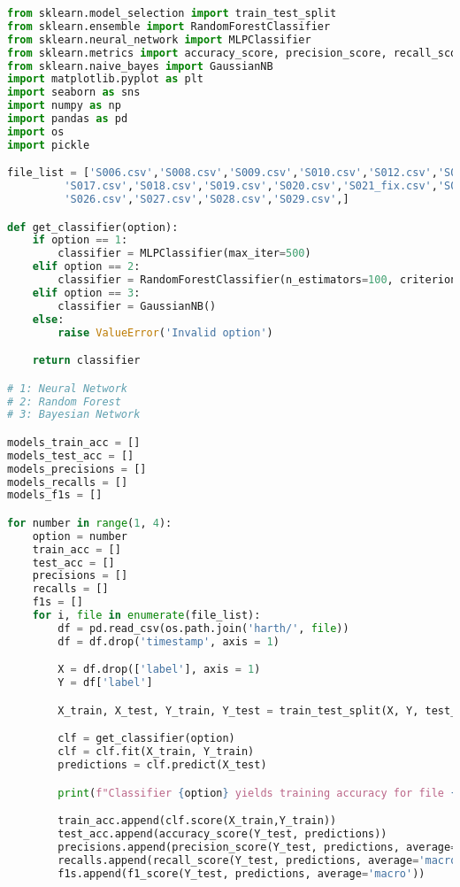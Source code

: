 \begin{lstlisting}[language=Python]
from sklearn.model_selection import train_test_split
from sklearn.ensemble import RandomForestClassifier
from sklearn.neural_network import MLPClassifier
from sklearn.metrics import accuracy_score, precision_score, recall_score, f1_score
from sklearn.naive_bayes import GaussianNB
import matplotlib.pyplot as plt
import seaborn as sns
import numpy as np
import pandas as pd
import os
import pickle

file_list = ['S006.csv','S008.csv','S009.csv','S010.csv','S012.csv','S013.csv','S014.csv','S015_fix.csv','S016.csv',
         'S017.csv','S018.csv','S019.csv','S020.csv','S021_fix.csv','S022.csv','S023_fix.csv','S024.csv','S025.csv',
         'S026.csv','S027.csv','S028.csv','S029.csv',]

def get_classifier(option):
    if option == 1:
        classifier = MLPClassifier(max_iter=500)
    elif option == 2:
        classifier = RandomForestClassifier(n_estimators=100, criterion='entropy', random_state=42)
    elif option == 3:
        classifier = GaussianNB()
    else:
        raise ValueError('Invalid option')

    return classifier

# 1: Neural Network
# 2: Random Forest
# 3: Bayesian Network

models_train_acc = []
models_test_acc = []
models_precisions = []
models_recalls = []
models_f1s = []

for number in range(1, 4):
    option = number
    train_acc = []
    test_acc = []
    precisions = []
    recalls = []
    f1s = []
    for i, file in enumerate(file_list):
        df = pd.read_csv(os.path.join('harth/', file))
        df = df.drop('timestamp', axis = 1)

        X = df.drop(['label'], axis = 1)
        Y = df['label']

        X_train, X_test, Y_train, Y_test = train_test_split(X, Y, test_size=0.3)

        clf = get_classifier(option)
        clf = clf.fit(X_train, Y_train)
        predictions = clf.predict(X_test)

        print(f"Classifier {option} yields training accuracy for file {file} of {clf.score(X_train,Y_train)} with a testing accuracy of {accuracy_score(Y_test, predictions)}")

        train_acc.append(clf.score(X_train,Y_train))
        test_acc.append(accuracy_score(Y_test, predictions))
        precisions.append(precision_score(Y_test, predictions, average='macro'))
        recalls.append(recall_score(Y_test, predictions, average='macro'))
        f1s.append(f1_score(Y_test, predictions, average='macro'))


\end{lstlisting}
